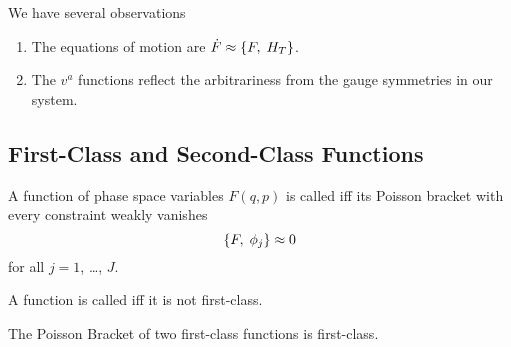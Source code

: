  We have several observations
\begin{enumerate}
\item The equations of motion are
  $\dot{F}\approx\left\{F,\;H_{T}\right\}$.
\item The $v^{a}$ functions reflect the arbitrariness from the gauge
  symmetries in our system.
\end{enumerate}

\subsection{First-Class and Second-Class Functions}
\begin{definition}\label{defn:constrained:first-class}\label{defn:constrained:second-class}
A function of phase space variables $F(q,p)$ is called
 iff its Poisson bracket with every constraint
weakly vanishes
\begin{equation}
\left\{F,\;\phi_{j}\right\}\approx0
\end{equation}
for all $j=1$, \dots, $J$.

A function is called  iff it is not first-class.
\end{definition}

\begin{theorem}
The Poisson Bracket of two first-class functions is first-class.
\end{theorem}

